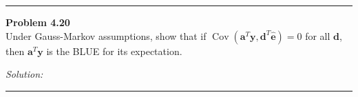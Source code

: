 \documentclass[a4paper, 11pt]{article}
\newenvironment{problem}[2][Problem]
    { \begin{mdframed}[backgroundcolor=gray!20] \textbf{#1 #2} \\}
    {  \end{mdframed}}
\newenvironment{solution}
    {\textit{Solution:}}
    {}
\begin{document}
\noindent\rule{7in}{2.8pt}

\begin{problem}{4.20}
Under Gauss-Markov assumptions, show that if \(\operatorname{Cov}\left(\mathbf{a}^{T} \mathbf{y}, \mathbf{d}^{T} \hat{\mathbf{e}}\right)=0\) for all \(\mathbf{d}\),
then \(\mathbf{a}^{T} \mathbf{y}\) is the BLUE for its expectation.

\end{problem}
\begin{solution}

\end{solution} 

\noindent\rule{7in}{2.8pt}

\end{document}
